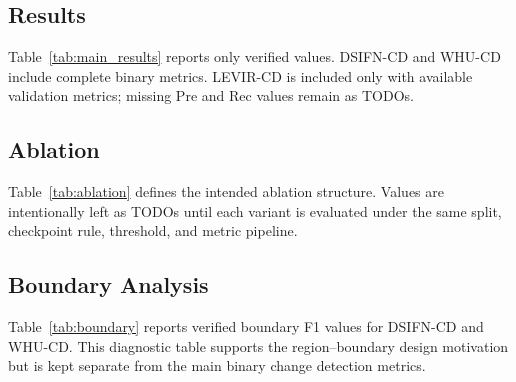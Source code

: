 \subsection{Results}



Table~\ref{tab:main_results} reports only verified values. DSIFN-CD and WHU-CD include complete binary metrics. LEVIR-CD is included only with available validation metrics; missing Pre and Rec values remain as TODOs.

\subsection{Ablation}



Table~\ref{tab:ablation} defines the intended ablation structure. Values are intentionally left as TODOs until each variant is evaluated under the same split, checkpoint rule, threshold, and metric pipeline.

\subsection{Boundary Analysis}



Table~\ref{tab:boundary} reports verified boundary F1 values for DSIFN-CD and WHU-CD. This diagnostic table supports the region--boundary design motivation but is kept separate from the main binary change detection metrics.


